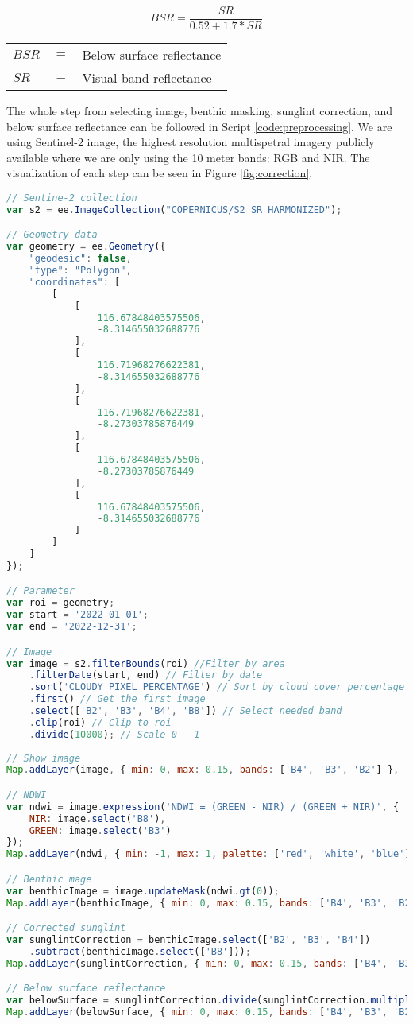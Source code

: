 \begin{equation}
	\label{eq:belowSurface}
	BSR = \frac{SR}{0.52 + 1.7 * SR}
\end{equation}

\begin{tabular}{l l l}
	$BSR$ & $=$ & Below surface reflectance \\
	$SR$ & $=$ & Visual band reflectance \\
\end{tabular}

The whole step from selecting image, benthic masking, sunglint correction, and below surface reflectance can be followed in Script \ref{code:preprocessing}. We are using Sentinel-2 image, the highest resolution multispetral imagery publicly available where we are only using the 10 meter bands: RGB and NIR. The visualization of each step can be seen in Figure \ref{fig:correction}.

\begin{lstlisting}[language=JavaScript, label={code:preprocessing}, caption={GEE script for multiple benthic correction}]
// Sentine-2 collection
var s2 = ee.ImageCollection("COPERNICUS/S2_SR_HARMONIZED");

// Geometry data
var geometry = ee.Geometry({
	"geodesic": false,
	"type": "Polygon",
	"coordinates": [
		[
			[
				116.67848403575506,
				-8.314655032688776
			],
			[
				116.71968276622381,
				-8.314655032688776
			],
			[
				116.71968276622381,
				-8.27303785876449
			],
			[
				116.67848403575506,
				-8.27303785876449
			],
			[
				116.67848403575506,
				-8.314655032688776
			]
		]
	]
});

// Parameter
var roi = geometry;
var start = '2022-01-01';
var end = '2022-12-31';

// Image
var image = s2.filterBounds(roi) //Filter by area
	.filterDate(start, end) // Filter by date
	.sort('CLOUDY_PIXEL_PERCENTAGE') // Sort by cloud cover percentage
	.first() // Get the first image
	.select(['B2', 'B3', 'B4', 'B8']) // Select needed band
	.clip(roi) // Clip to roi
	.divide(10000); // Scale 0 - 1
	
// Show image
Map.addLayer(image, { min: 0, max: 0.15, bands: ['B4', 'B3', 'B2'] }, 'Image');

// NDWI
var ndwi = image.expression('NDWI = (GREEN - NIR) / (GREEN + NIR)', {
	NIR: image.select('B8'),
	GREEN: image.select('B3')
});
Map.addLayer(ndwi, { min: -1, max: 1, palette: ['red', 'white', 'blue'] }, 'NDWI');

// Benthic mage
var benthicImage = image.updateMask(ndwi.gt(0));
Map.addLayer(benthicImage, { min: 0, max: 0.15, bands: ['B4', 'B3', 'B2'] }, 'Benthic Image');

// Corrected sunglint
var sunglintCorrection = benthicImage.select(['B2', 'B3', 'B4'])
	.subtract(benthicImage.select(['B8']));
Map.addLayer(sunglintCorrection, { min: 0, max: 0.15, bands: ['B4', 'B3', 'B2'] }, 'Corrected Sunglint Image');

// Below surface reflectance
var belowSurface = sunglintCorrection.divide(sunglintCorrection.multiply(1.7).add(0.52));
Map.addLayer(belowSurface, { min: 0, max: 0.15, bands: ['B4', 'B3', 'B2'] }, 'Below surface reflectance');
\end{lstlisting}

